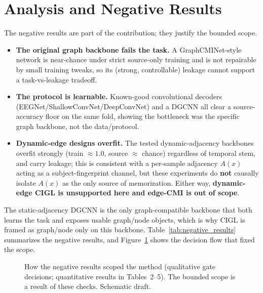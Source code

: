 \section{Analysis and Negative Results}
\label{sec:analysis}

The negative results are part of the contribution; they justify the bounded scope.

\begin{itemize}
  \item[(i)] \textbf{The original graph backbone fails the task.} A GraphCMINet-style network is near-chance
  under strict source-only training and is not repairable by small training tweaks, so its (strong,
  controllable) leakage cannot support a task-vs-leakage tradeoff.
  \item[(ii)] \textbf{The protocol is learnable.} Known-good convolutional decoders
  (EEGNet/ShallowConvNet/DeepConvNet) and a DGCNN all clear a source-accuracy floor on the same fold,
  showing the bottleneck was the specific graph backbone, not the data/protocol.
  \item[(iii)] \textbf{Dynamic-edge designs overfit.} The tested dynamic-adjacency backbones overfit
  strongly (train $\approx 1.0$, source $\approx$ chance) regardless of temporal stem, and carry leakage;
  this is consistent with a per-sample adjacency $A(x)$ acting as a subject-fingerprint channel, but these
  experiments do \textbf{not} causally isolate $A(x)$ as the only source of memorization. Either way,
  \textbf{dynamic-edge CIGL is unsupported here and edge-CMI is out of scope}.
\end{itemize}

The static-adjacency DGCNN is the only graph-compatible backbone that both learns the task and exposes
usable graph/node objects, which is why CIGL is framed as graph/node only on this backbone.
Table~\ref{tab:negative_results} summarizes the negative results, and Figure~\ref{fig:flow} shows the
decision flow that fixed the scope.



\begin{figure}[t]
  \centering
  \caption{How the negative results scoped the method (qualitative gate decisions; quantitative results in
  Tables~2--5). The bounded scope is a result of these checks. Schematic draft.}
  \label{fig:flow}
\end{figure}
